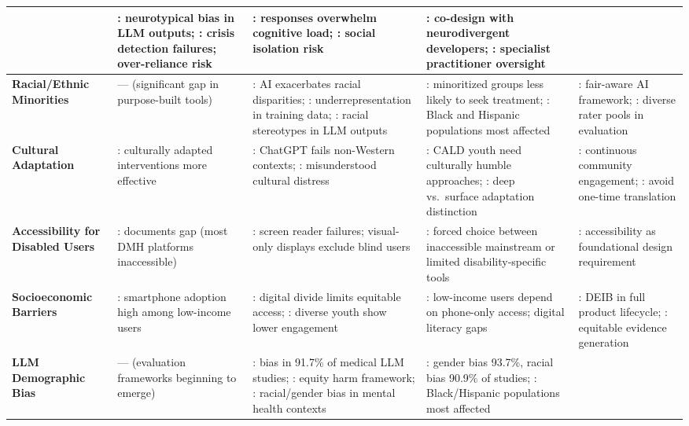 \begin{table}[!ht]
\begin{tabularx}{\textwidth}{>{\bfseries}p{2.4cm} X X X X}
& \cite{killian_2023}: neurotypical bias in LLM outputs; \cite{papadopoulos_2025}: crisis detection failures; over-reliance risk
& \cite{killian_2023}: responses overwhelm cognitive load; \cite{papadopoulos_2025}: social isolation risk
& \cite{papadopoulos_2025}: co-design with neurodivergent developers; \cite{killian_2023}: specialist practitioner oversight \\
\midrule
Racial/Ethnic Minorities
& --- (significant gap in purpose-built tools)
& \cite{haider_2024}: AI exacerbates racial disparities; \cite{timmons_2023}: underrepresentation in training data; \cite{straw_2020}: racial stereotypes in LLM outputs
& \cite{timmons_2023}: minoritized groups less likely to seek treatment; \cite{haider_2024}: Black and Hispanic populations most affected
& \cite{timmons_2023}: fair-aware AI framework; \cite{omar_2025}: diverse rater pools in evaluation \\
\midrule
Cultural Adaptation
& \cite{naderbagi_2024}: culturally adapted interventions more effective
& \cite{aleem_2024}: ChatGPT fails non-Western contexts; \cite{soubutts_2024}: misunderstood cultural distress
& \cite{soubutts_2024}: CALD youth need culturally humble approaches; \cite{naderbagi_2024}: deep vs.\ surface adaptation distinction
& \cite{naderbagi_2024}: continuous community engagement; \cite{soubutts_2024}: avoid one-time translation \\
\midrule
Accessibility for Disabled Users
& \cite{khan_seo_2025}: documents gap (most DMH platforms inaccessible)
& \cite{khan_seo_2025}: screen reader failures; visual-only displays exclude blind users
& \cite{khan_seo_2025}: forced choice between inaccessible mainstream or limited disability-specific tools
& \cite{khan_seo_2025}: accessibility as foundational design requirement \\
\midrule
Socioeconomic Barriers
& \cite{robinson_2024}: smartphone adoption high among low-income users
& \cite{robinson_2024}: digital divide limits equitable access; \cite{huang_2024}: diverse youth show lower engagement
& \cite{robinson_2024}: low-income users depend on phone-only access; digital literacy gaps
& \cite{robinson_2024}: DEIB in full product lifecycle; \cite{timmons_2023}: equitable evidence generation \\
\midrule
LLM Demographic Bias
& --- (evaluation frameworks beginning to emerge)
& \cite{omar_2025}: bias in 91.7\% of medical LLM studies; \cite{pfohl_2024}: equity harm framework; \cite{straw_2020}: racial/gender bias in mental health contexts
& \cite{omar_2025}: gender bias 93.7\%, racial bias 90.9\% of studies; \cite{haider_2024}: Black/Hispanic populations most affected

\end{tabularx}
\end{table}
